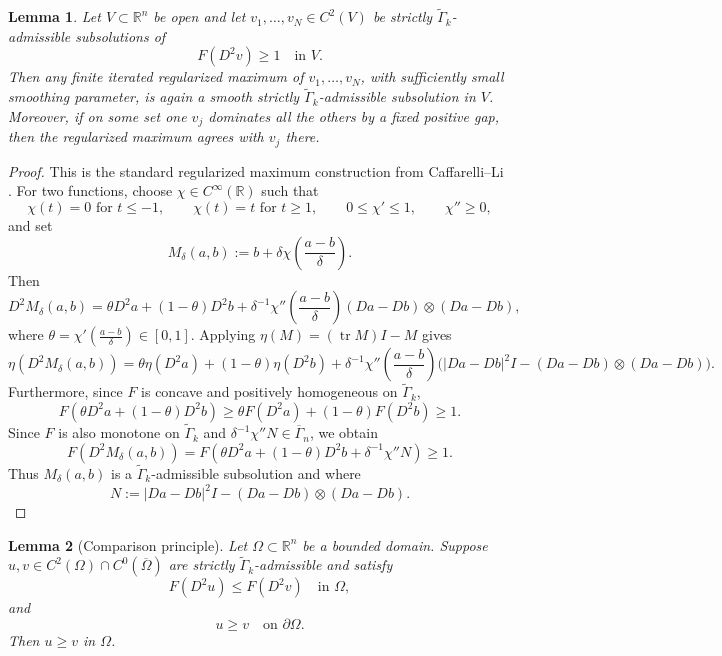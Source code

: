 \documentclass[reqno,a4paper]{amsart}
\numberwithin{equation}{section}
\newtheorem{lemma}{Lemma}[section]
\begin{document}
	\begin{lemma}\label{lem:regularized_max}
		Let $V \subset \mathbb{R}^n$ be open and let $v_1, \ldots, v_N \in C^2(V)$ be strictly $\widetilde{\Gamma}_k$-admissible subsolutions of
		\[
		F(D^2 v) \ge 1 \quad \text{in } V.
		\]
		Then any finite iterated regularized maximum of $v_1, \ldots, v_N$, with sufficiently small smoothing parameter, is again a smooth strictly $\widetilde{\Gamma}_k$-admissible subsolution in $V$. Moreover, if on some set one $v_j$ dominates all the others by a fixed positive gap, then the regularized maximum agrees with $v_j$ there.
	\end{lemma}
	
	\begin{proof}
		This is the standard regularized maximum construction from Caffarelli--Li \cite{CL03}. For two functions, choose $\chi \in C^\infty(\mathbb{R})$ such that
		\[
		\chi(t) = 0 \text{ for } t \le -1, \qquad
		\chi(t) = t \text{ for } t \ge 1, \qquad
		0 \le \chi' \le 1, \qquad
		\chi'' \ge 0,
		\]
		and set
		\[
		M_\delta(a,b) := b + \delta \chi\left(\frac{a-b}{\delta}\right).
		\]
		Then 
		\[
		D^2 M_\delta(a,b)
		= \theta D^2 a + (1-\theta) D^2 b
		+ \delta^{-1} \chi''\left(\frac{a-b}{\delta}\right) (Da - Db) \otimes (Da - Db),
		\]
		where $\theta = \chi'\left(\frac{a-b}{\delta}\right) \in [0,1]$.
		Applying $\eta(M) = (\operatorname{tr}M)I - M$ gives
		\[
		\eta(D^2 M_\delta(a,b))
		= \theta \eta(D^2 a) + (1-\theta) \eta(D^2 b)
		+ \delta^{-1} \chi''\left(\frac{a-b}{\delta}\right)
		\bigl(|Da - Db|^2 I - (Da - Db) \otimes (Da - Db)\bigr).
		\]
		Furthermore, since $F$ is concave and positively homogeneous on $\widetilde{\Gamma}_k$,
		\[
		F(\theta D^2 a + (1-\theta) D^2 b) \ge \theta F(D^2 a) + (1-\theta) F(D^2 b) \ge 1.
		\]
		Since $F$ is also monotone on $\widetilde{\Gamma}_k$ and $\delta^{-1}\chi'' N \in \overline{\Gamma}_n$, we obtain
		\[
		F(D^2 M_\delta(a,b)) = F(\theta D^2 a + (1-\theta) D^2 b + \delta^{-1}\chi'' N) \ge 1.
		\]
		Thus $M_\delta(a,b)$ is a $\widetilde{\Gamma}_k$-admissible subsolution and where 
		$$	N := 
	|Da - Db|^2 I - (Da - Db) \otimes (Da - Db).$$
	\end{proof}
	
	\begin{lemma}[Comparison principle]
		Let $\Omega \subset \mathbb{R}^n$ be a bounded domain. Suppose $u, v \in C^2(\Omega) \cap C^0(\overline{\Omega})$ are strictly $\widetilde{\Gamma}_k$-admissible and satisfy
		\[
		F(D^2 u) \le F(D^2 v) \quad \text{in } \Omega,
		\]
		and
		\[
		u \ge v \quad \text{on } \partial \Omega.
		\]
		Then $u \ge v$ in $\Omega$.
	\end{lemma}
	
\end{document}
